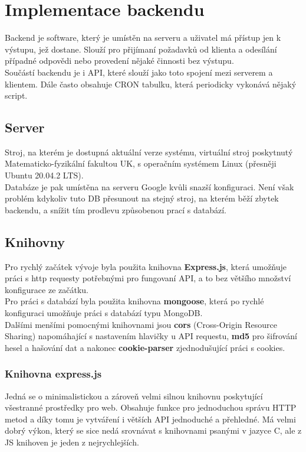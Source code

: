 \chapter{Implementace backendu}
Backend je software, který je umístěn na serveru a uživatel má přístup jen
k výstupu, jež dostane. Slouží pro přijímaní požadavků od klienta a odesílání
případné odpovědi nebo provedení nějaké činnosti bez výstupu.
\\
Součástí backendu je i API, které slouží jako toto spojení mezi serverem a
klientem. Dále často obsahuje CRON tabulku, která periodicky vykonává nějaký
script.

\section{Server}
Stroj, na kterém je dostupná aktuální verze systému, virtuální stroj poskytnutý
Matematicko-fyzikální fakultou UK, s operačním systémem Linux (přesněji Ubuntu
20.04.2 LTS).
\\
Databáze je pak umístěna na serveru Google kvůli snazší konfiguraci. Není však
problém kdykoliv tuto DB přesunout na stejný stroj, na kterém běží zbytek
backendu, a snížit tím prodlevu způsobenou prací s databází.


\section{Knihovny}
Pro rychlý začátek vývoje byla použita knihovna \textbf{Express.js}, která
umožňuje práci s http requesty potřebnými pro fungovaní API, a to 
bez většího množství konfigurace ze začátku.
\\
Pro práci s databází byla použita knihovna \textbf{mongoose}, která po rychlé konfiguraci
umožňuje práci s databází typu MongoDB.
\\
Dalšími menšími pomocnými knihovnami jsou
\textbf{cors} (Cross-Origin Resource Sharing) napomáhající s nastavením hlavičky u API requestu,
\textbf{md5} pro šifrování hesel a hašování dat a nakonec
\textbf{cookie-parser} zjednodušující práci s cookies.

\subsection{Knihovna express.js}
Jedná se o minimalistickou a zároveň velmi silnou knihovnu poskytující
všestranné prostředky pro web. Obsahuje funkce pro jednoduchou správu HTTP metod
a díky tomu je vytváření i větších API jednoduché a přehledné. Má velmi dobrý
výkon, který se sice nedá srovnávat s knihovnami psanými v jazyce C, ale z JS
knihoven je jeden z nejrychlejších.

